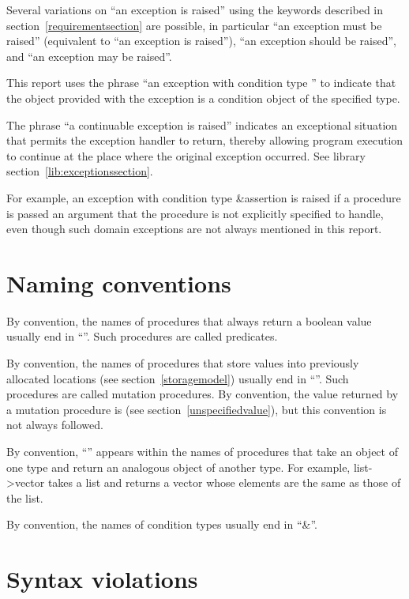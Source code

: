 Several variations on ``an exception is raised'' using the keywords
described in section~\ref{requirementsection} are possible, in
particular ``an exception must be raised'' (equivalent to ``an
exception is raised''), ``an exception should be raised'', and ``an
exception may be raised''.

This report uses the phrase ``an exception with condition type ''
to indicate that the object provided with the
exception is a condition object of the specified type.

The phrase ``a continuable exception is raised'' indicates
an exceptional situation that permits the exception handler to return,
thereby allowing program execution to continue at the place where the
original exception occurred.  See library section~\ref{lib:exceptionssection}.

For example, an exception with condition type {\cf\&assertion}
is raised if a procedure is passed an argument that the procedure
is not explicitly specified to handle, even though such domain
exceptions are not always mentioned in this report.

\section{Naming conventions}

By convention, the names of procedures that always return a boolean
value usually end
in ``''.  Such procedures are called predicates.

By convention, the names of procedures that store values into previously
allocated locations (see section~\ref{storagemodel}) usually end in
``\ide{!}''.
Such procedures are called mutation procedures.
By convention, the value returned by a mutation procedure is
\unspecifiedreturn{} (see section~\ref{unspecifiedvalue}),
but this convention is not always followed.

By convention, ``\ide{->}'' appears within the names of procedures that
take an object of one type and return an analogous object of another type.
For example, {\cf list->vector} takes a list and returns a vector whose
elements are the same as those of the list.

By convention, the names of condition types usually end in
``{\cf\&}''.

\section{Syntax violations}

